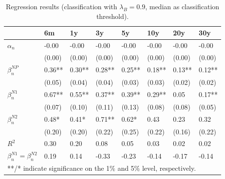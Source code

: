 \documentclass[11pt,a4paper,english,oneside]{book}
\numberwithin{equation}{chapter}
\begin{document}
\begin{table}[h] %
	\centering %
	\begin{tabular}{ p{2cm}  p{1cm} p{1cm} p{1cm} p{1cm} p{1cm} p{1cm} p{1cm} } %
		\toprule %
		& 6m 		& 1y 		& 3y 		& 5y 		& 10y 		& 20y 		& 30y \\
		\midrule %
		$\alpha_n$ & -0.00 & -0.00 & -0.00 & -0.00 & -0.00 & -0.00 & -0.00\\
		& (0.00) & (0.00) & (0.00) & (0.00) & (0.00) & (0.00) & (0.00)\\
		$\beta_n^{NP}$ & 0.36** & 0.30** & 0.28** & 0.25** & 0.18** & 0.13** & 0.12**\\
		& (0.05) & (0.04) & (0.04) & (0.03) & (0.03) & (0.02) & (0.02)\\
		$\beta_n^{N1}$ & 0.67** & 0.55** & 0.37** & 0.39** & 0.29** & 0.05 & 0.17**\\
		& (0.07) & (0.10) & (0.11) & (0.13) & (0.08) & (0.08) & (0.05)\\
		$\beta_n^{N2}$ & 0.48* & 0.41* & 0.71** & 0.62* & 0.43 & 0.23 & 0.32\\
		& (0.20) & (0.20) & (0.22) & (0.25) & (0.22) & (0.16) & (0.22)\\
		$R^2$ & 0.30 & 0.20 & 0.08 & 0.05 & 0.03 & 0.02 & 0.02\\
		$\beta_n^{N1} = \beta_n^{N2}$ & 0.19 & 0.14 & -0.33 & -0.23 & -0.14 & -0.17 & -0.14\\
		\midrule																
		\multicolumn{8}{l}{**/* indicate significance on the 1\% and 5\% level, respectively.} \\
		\bottomrule %
	\end{tabular}
	\caption{Regression results (classification with $\lambda_B=0.9$, median as classification threshold).} %
	\label{tab:reg3Mod} %
\end{table}
\end{document}
